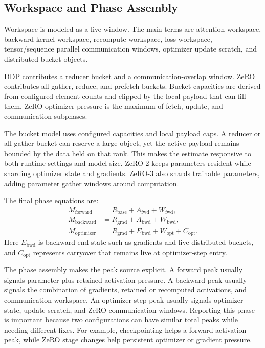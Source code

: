 \subsection{Workspace and Phase Assembly}
Workspace is modeled as a live window. The main terms are attention workspace,
backward kernel workspace, recompute workspace, loss workspace, tensor/sequence
parallel communication windows, optimizer update scratch, and distributed
bucket objects.

DDP contributes a reducer bucket and a communication-overlap window. ZeRO
contributes all-gather, reduce, and prefetch buckets. Bucket capacities are
derived from configured element counts and clipped by the local payload that
can fill them. ZeRO optimizer pressure is the maximum of fetch, update, and
communication subphases.

The bucket model uses configured capacities and local payload caps. A reducer
or all-gather bucket can reserve a large object, yet the active payload remains
bounded by the data held on that rank. This makes the estimate responsive to
both runtime settings and model size. ZeRO-2 keeps parameters resident while
sharding optimizer state and gradients. ZeRO-3 also shards trainable
parameters, adding parameter gather windows around computation.

The final phase equations are:
\[
\begin{aligned}
M_{\mathrm{forward}} &= R_{\mathrm{base}} + A_{\mathrm{fwd}} + W_{\mathrm{fwd}}, \\
M_{\mathrm{backward}} &= R_{\mathrm{grad}} + A_{\mathrm{bwd}} + W_{\mathrm{bwd}}, \\
M_{\mathrm{optimizer}} &=
R_{\mathrm{grad}} + E_{\mathrm{bwd}} + W_{\mathrm{opt}} + C_{\mathrm{opt}}.
\end{aligned}
\]
Here $E_{\mathrm{bwd}}$ is backward-end state such as gradients and live
distributed buckets, and $C_{\mathrm{opt}}$ represents carryover that remains
live at optimizer-step entry.

The phase assembly makes the peak source explicit. A forward peak usually
signals parameter plus retained activation pressure. A backward peak usually
signals the combination of gradients, retained or recomputed activations, and
communication workspace. An optimizer-step peak usually signals optimizer
state, update scratch, and ZeRO communication windows. Reporting this phase is
important because two configurations can have similar total peaks while needing
different fixes. For example, checkpointing helps a forward-activation peak,
while ZeRO stage changes help persistent optimizer or gradient pressure.

